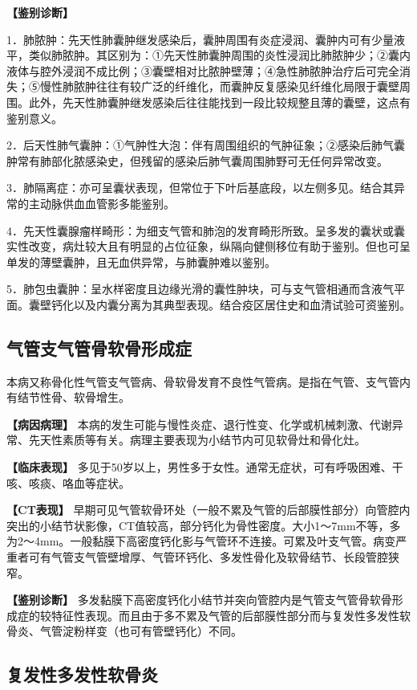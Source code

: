 \textbf{【鉴别诊断】}

1．肺脓肿：先天性肺囊肿继发感染后，囊肿周围有炎症浸润、囊肿内可有少量液平，类似肺脓肿。其区别为：①先天性肺囊肿周围的炎性浸润比肺脓肿少；②囊内液体与腔外浸润不成比例；③囊壁相对比脓肿壁薄；④急性肺脓肿治疗后可完全消失；⑤慢性肺脓肿往往有较广泛的纤维化，而囊肿反复感染见纤维化局限于囊壁周围。此外，先天性肺囊肿继发感染后往往能找到一段比较规整且薄的囊壁，这点有鉴别意义。

2．后天性肺气囊肿：①气肿性大泡：伴有周围组织的气肿征象；②感染后肺气囊肿常有肺部化脓感染史，但残留的感染后肺气囊周围肺野可无任何异常改变。

3．肺隔离症：亦可呈囊状表现，但常位于下叶后基底段，以左侧多见。结合其异常的主动脉供血血管影多能鉴别。

4．先天性囊腺瘤样畸形：为细支气管和肺泡的发育畸形所致。呈多发的囊状或囊实性改变，病灶较大且有明显的占位征象，纵隔向健侧移位有助于鉴别。但也可呈单发的薄壁囊肿，且无血供异常，与肺囊肿难以鉴别。

5．肺包虫囊肿：呈水样密度且边缘光滑的囊性肿块，可与支气管相通而含液气平面。囊壁钙化以及内囊分离为其典型表现。结合疫区居住史和血清试验可资鉴别。

\subsection{气管支气管骨软骨形成症}

本病又称骨化性气管支气管病、骨软骨发育不良性气管病。是指在气管、支气管内有结节性骨、软骨增生。

\textbf{【病因病理】}
本病的发生可能与慢性炎症、退行性变、化学或机械刺激、代谢异常、先天性素质等有关。病理主要表现为小结节内可见软骨灶和骨化灶。

\textbf{【临床表现】}
多见于50岁以上，男性多于女性。通常无症状，可有呼吸困难、干咳、咳痰、咯血等症状。

\textbf{【CT表现】}
早期可见气管软骨环处（一般不累及气管的后部膜性部分）向管腔内突出的小结节状影像，CT值较高，部分钙化为骨性密度。大小1～7mm不等，多为2～4mm。一般黏膜下高密度钙化影与气管环不连接。可累及叶支气管。病变严重者可有气管支气管壁增厚、气管环钙化、多发性骨化及软骨结节、长段管腔狭窄。

\textbf{【鉴别诊断】}
多发黏膜下高密度钙化小结节并突向管腔内是气管支气管骨软骨形成症的较特征性表现。而且由于多不累及气管的后部膜性部分而与复发性多发性软骨炎、气管淀粉样变（也可有管壁钙化）不同。

\subsection{复发性多发性软骨炎}

